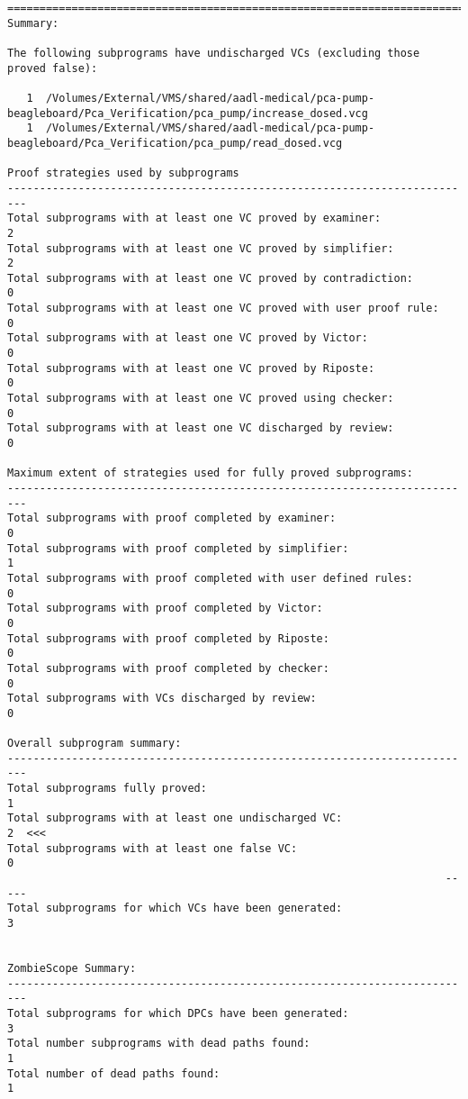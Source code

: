\begin{lstlisting}[frame=single, gobble=0, caption={Second POGS report}, label={listing:pcapump_dosemonitor_pogs2}]
===============================================================================
Summary:

The following subprograms have undischarged VCs (excluding those proved false):

   1  /Volumes/External/VMS/shared/aadl-medical/pca-pump-beagleboard/Pca_Verification/pca_pump/increase_dosed.vcg
   1  /Volumes/External/VMS/shared/aadl-medical/pca-pump-beagleboard/Pca_Verification/pca_pump/read_dosed.vcg

Proof strategies used by subprograms
-------------------------------------------------------------------------
Total subprograms with at least one VC proved by examiner:              2
Total subprograms with at least one VC proved by simplifier:            2
Total subprograms with at least one VC proved by contradiction:         0
Total subprograms with at least one VC proved with user proof rule:     0
Total subprograms with at least one VC proved by Victor:                0
Total subprograms with at least one VC proved by Riposte:               0
Total subprograms with at least one VC proved using checker:            0
Total subprograms with at least one VC discharged by review:            0

Maximum extent of strategies used for fully proved subprograms:
-------------------------------------------------------------------------
Total subprograms with proof completed by examiner:                     0
Total subprograms with proof completed by simplifier:                   1
Total subprograms with proof completed with user defined rules:         0
Total subprograms with proof completed by Victor:                       0
Total subprograms with proof completed by Riposte:                      0
Total subprograms with proof completed by checker:                      0
Total subprograms with VCs discharged by review:                        0

Overall subprogram summary:
-------------------------------------------------------------------------
Total subprograms fully proved:                                         1
Total subprograms with at least one undischarged VC:                    2  <<<
Total subprograms with at least one false VC:                           0
                                                                    -----
Total subprograms for which VCs have been generated:                    3


ZombieScope Summary:
-------------------------------------------------------------------------
Total subprograms for which DPCs have been generated:                   3
Total number subprograms with dead paths found:                         1
Total number of dead paths found:                                       1



\end{lstlisting}
